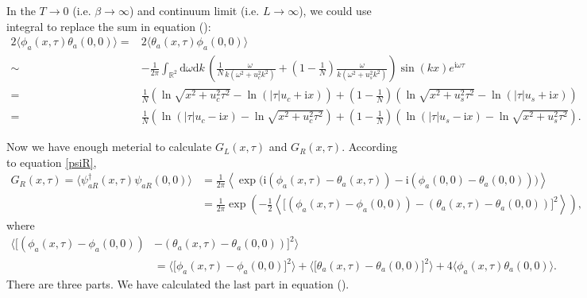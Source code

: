 \documentclass[10pt]{extarticle}
\newcommand{\dd}{\mathrm{d}}
\newcommand{\ii}{\mathrm{i}}
\begin{document}
In the $T\to 0$ (i.e. $\beta\to \infty$) and continuum limit (i.e. $L\to \infty$), we could use integral to replace the sum in equation (\theequation):
\begin{equation}
\begin{aligned}
	2\langle \phi_a(x,\tau)\theta_a(0,0)\rangle=&2\langle \theta_a(x,\tau)\phi_a(0,0)\rangle \\
	\sim&-\frac{1}{2\pi}\int_{\mathbb{R}^2} \dd\omega\dd k\,\left(\frac{1}{N}\frac{\omega}{k(\omega^2+u_c^2k^2)}+\left(1-\frac{1}{N}\right)\frac{\omega}{k(\omega^2+u_s^2k^2)}\right)\sin(kx)e^{\ii\omega\tau}\\
	=&\frac{1}{N}\left(\ln \sqrt{x^2+u_c^2\tau^2}-\ln (|\tau|u_c+\ii x)\right)+\left(1-\frac{1}{N}\right)\left(\ln \sqrt{x^2+u_s^2\tau^2}-\ln (|\tau|u_s+\ii x)\right)\\
	=&\frac{1}{N}\left(\ln (|\tau|u_c-\ii x)-\ln \sqrt{x^2+u_c^2\tau^2}\right)+\left(1-\frac{1}{N}\right)\left(\ln (|\tau|u_s-\ii x)-\ln \sqrt{x^2+u_s^2\tau^2}\right).
\end{aligned}
\end{equation}

Now we have enough meterial to calculate $G_L(x,\tau)$ and $G_R(x,\tau)$. According to equation \eqref{psiR},
\begin{align*}
	G_R(x,\tau) = \langle \psi_{aR}^\dag(x,\tau)\psi_{aR}(0,0)\rangle &= \frac{1}{2\pi}\left\langle \exp\bigl(\ii (\phi_a(x,\tau)-\theta_a(x,\tau))-\ii (\phi_a(0,0)-\theta_a(0,0))\bigr)\right\rangle\\
	&=\frac{1}{2\pi} \exp\left(-\frac{1}{2} \left\langle\bigl[(\phi_a(x,\tau)-\phi_a(0,0))-(\theta_a(x,\tau)-\theta_a(0,0))\bigr]^2\right\rangle\right),
\end{align*}
where
\[
\begin{aligned}
\biggr\langle\bigl[(\phi_a(x,\tau)-\phi_a(0,0))&-(\theta_a(x,\tau)-\theta_a(0,0))\bigr]^2\biggr\rangle\\
&=\bigl\langle\bigl[\phi_a(x,\tau)-\phi_a(0,0)\bigr]^2\bigr\rangle+\bigl\langle\bigl[\theta_a(x,\tau)-\theta_a(0,0)\bigr]^2\bigr\rangle+4\langle\phi_a(x,\tau)\theta_a(0,0)\rangle.
\end{aligned}
\]
There are three parts. We have calculated the last part in equation (\theequation).
\end{document}

